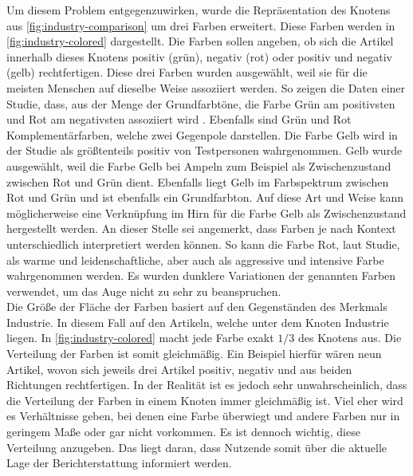 Um diesem Problem entgegenzuwirken, wurde die Repräsentation des Knotens aus \autoref{fig:industry-comparison} um drei Farben erweitert.
Diese Farben werden in \autoref{fig:industry-colored} dargestellt.
Die Farben sollen angeben, ob sich die Artikel innerhalb dieses Knotens positiv (grün), negativ (rot) oder positiv und negativ (gelb) rechtfertigen.
Diese drei Farben wurden ausgewählt, weil sie für die meisten Menschen auf dieselbe Weise assoziiert werden.
So zeigen die Daten einer Studie, dass, aus der Menge der Grundfarbtöne, die Farbe Grün am positivsten und Rot am negativsten assoziiert wird \cite{color-emotion}.
Ebenfalls sind Grün und Rot Komplementärfarben, welche zwei Gegenpole darstellen.
Die Farbe Gelb wird in der Studie als größtenteils positiv von Testpersonen wahrgenommen.
Gelb wurde ausgewählt, weil die Farbe Gelb bei Ampeln zum Beispiel als Zwischenzustand zwischen Rot und Grün dient.
Ebenfalls liegt Gelb im Farbspektrum zwischen Rot und Grün und ist ebenfalls ein Grundfarbton.
Auf diese Art und Weise kann möglicherweise eine Verknüpfung im Hirn für die Farbe Gelb als Zwischenzustand hergestellt werden.
An dieser Stelle sei angemerkt, dass Farben je nach Kontext unterschiedlich interpretiert werden können.
So kann die Farbe Rot, laut Studie, als warme und leidenschaftliche, aber auch als aggressive und intensive Farbe wahrgenommen werden.
Es wurden dunklere Variationen der genannten Farben verwendet, um das Auge nicht zu sehr zu beanspruchen.\\

Die Größe der Fläche der Farben basiert auf den Gegenständen des Merkmals Industrie.
In diesem Fall auf den Artikeln, welche unter dem Knoten Industrie liegen.
In \autoref{fig:industry-colored} macht jede Farbe exakt $1/3$ des Knotens aus.
Die Verteilung der Farben ist somit gleichmäßig.
Ein Beispiel hierfür wären neun Artikel, wovon sich jeweils drei Artikel positiv, negativ und aus beiden Richtungen rechtfertigen.
In der Realität ist es jedoch sehr unwahrscheinlich, dass die Verteilung der Farben in einem Knoten immer gleichmäßig ist.
Viel eher wird es Verhältnisse geben, bei denen eine Farbe überwiegt und andere Farben nur in geringem Maße oder gar nicht vorkommen.
Es ist dennoch wichtig, diese Verteilung anzugeben.
Das liegt daran, dass Nutzende somit über die aktuelle Lage der Berichterstattung informiert werden. \\

